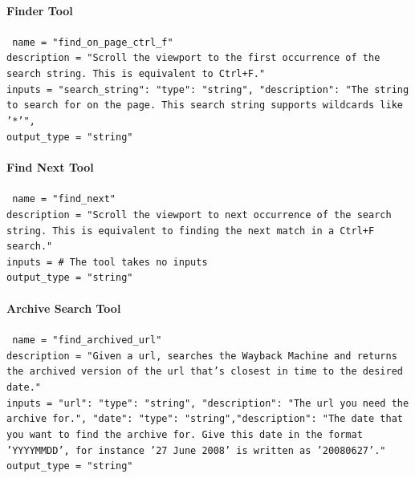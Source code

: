 \documentclass[11pt]{article}
\begin{document}
\paragraph{Finder Tool}

\texttt{\
name = "find\_on\_page\_ctrl\_f"\\
description = "Scroll the viewport to the first occurrence of the search string. This is equivalent to Ctrl+F."\\
inputs = {"search\_string": {"type": "string", "description": "The string to search for on the page. This search string supports wildcards like '*'",}}\\
output\_type = "string"}

\paragraph{Find Next Tool}
\texttt{\
name = "find\_next"\\
description = "Scroll the viewport to next occurrence of the search string. This is equivalent to finding the next match in a Ctrl+F search."\\
inputs = {} \# The tool takes no inputs\\
output\_type = "string"}

\paragraph{Archive Search Tool}
\texttt{\
name = "find\_archived\_url"\\
description = "Given a url, searches the Wayback Machine and returns the archived version of the url that's closest in time to the desired date."\\
inputs = {"url": {"type": "string", "description": "The url you need the archive for."},
"date": {"type": "string","description": "The date that you want to find the archive for. Give this date in the format 'YYYYMMDD', for instance '27 June 2008' is written as '20080627'."}}\\
output\_type = "string"}
\end{document}
